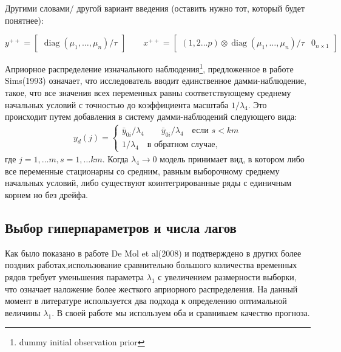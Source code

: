 \documentclass[11pt]{article} %
\DeclareMathOperator{\diag}{diag}
\begin{document}
Другими словами/ другой вариант введения (оставить нужно тот, который будет понятнее):

\begin{equation}
y^{++}=\begin{bmatrix}\diag(\mu_1,\ldots,\mu_n)/\tau\end{bmatrix}\qquad
x^{++}=\begin{bmatrix}(1,2\ldots p)\otimes \diag(\mu_1,\ldots,\mu_n)/\tau &0_{n\times 1}\end{bmatrix}
\end{equation}


Априорное распределение изначального наблюдения\footnote{dummy initial observation prior }, предложенное в работе Sims(1993) означает, что исследователь вводит единственное дамми-наблюдение, такое, что все значения всех переменных равны соответствующему среднему начальных условий с точностью до коэффициента масштаба $1/\lambda_4$. Это происходит  путем добавления в систему дамми-наблюдений следующего вида:
\begin{gather*}
y_d(j)=\begin{cases}\bar y_{0i}/\lambda_4 \qquad
\bar y_{0i}/\lambda_4\quad \text{если }s<km\\
1/\lambda_4 \quad \text{в обратном случае,}
\end{cases}
\end{gather*}
где $j=1,\ldots m, s=1,\ldots km$. Когда $\lambda_4\to 0 $ модель принимает вид, в котором либо все переменные стационарны со средним, равным выборочному среднему начальных условий, либо существуют коинтегрированные ряды с  единичным корнем но без дрейфа.

\subsection{Выбор гиперпараметров и числа лагов}

Как было показано в работе De Mol et al(2008) и подтверждено в других более поздних работах,использование сравнительно большого количества временных рядов требует уменьшения параметра $\lambda_1$ с увеличением размерности выборки, что означает наложение более жесткого априорного распределения. На данный момент в литературе используется два подхода к определению оптимальной величины $\lambda_1$. В своей работе мы используем оба и сравниваем качество прогноза.
\end{document}
